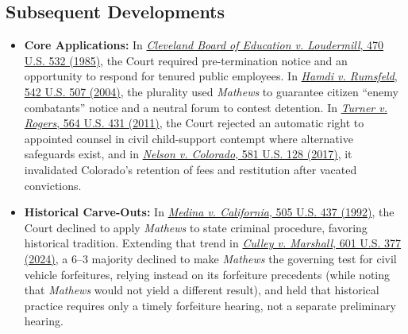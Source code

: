 \documentclass[12pt]{article}
\begin{document}
\subsection{Subsequent Developments}

\begin{itemize}
    \item \textbf{Core Applications:} In \href{https://supreme.justia.com/cases/federal/us/470/532/}{\emph{Cleveland Board of Education v. Loudermill}, 470 U.S. 532 (1985)}, the Court required pre-termination notice and an opportunity to respond for tenured public employees. In \href{https://supreme.justia.com/cases/federal/us/542/507/}{\emph{Hamdi v. Rumsfeld}, 542 U.S. 507 (2004)}, the plurality used \emph{Mathews} to guarantee citizen ``enemy combatants'' notice and a neutral forum to contest detention. In \href{https://supreme.justia.com/cases/federal/us/564/431/}{\emph{Turner v. Rogers}, 564 U.S. 431 (2011)}, the Court rejected an automatic right to appointed counsel in civil child-support contempt where alternative safeguards exist, and in \href{https://supreme.justia.com/cases/federal/us/581/15-1256/}{\emph{Nelson v. Colorado}, 581 U.S. 128 (2017)}, it invalidated Colorado's retention of fees and restitution after vacated convictions.
    \item \textbf{Historical Carve-Outs:} In \href{https://supreme.justia.com/cases/federal/us/505/437/}{\emph{Medina v. California}, 505 U.S. 437 (1992)}, the Court declined to apply \emph{Mathews} to state criminal procedure, favoring historical tradition. Extending that trend in \href{https://supreme.justia.com/cases/federal/us/601/22-585/}{\emph{Culley v. Marshall}, 601 U.S. 377 (2024)}, a 6--3 majority declined to make \emph{Mathews} the governing test for civil vehicle forfeitures, relying instead on its forfeiture precedents (while noting that \emph{Mathews} would not yield a different result), and held that historical practice requires only a timely forfeiture hearing, not a separate preliminary hearing.

\end{itemize}
\end{document}
